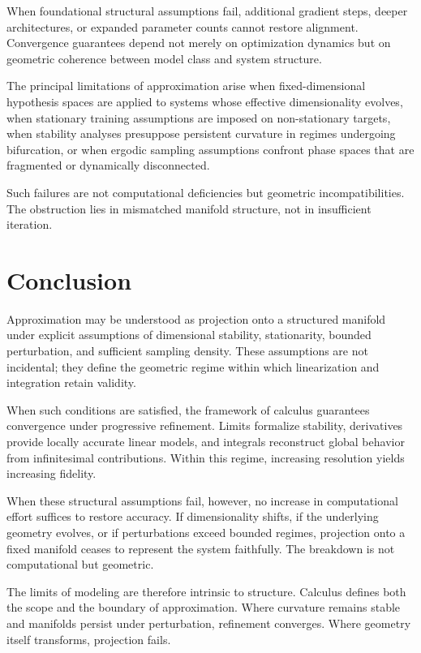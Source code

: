 \documentclass[12pt]{book}
\begin{document}
When foundational structural assumptions fail, additional gradient steps, deeper architectures, or expanded parameter counts cannot restore alignment. Convergence guarantees depend not merely on optimization dynamics but on geometric coherence between model class and system structure.

The principal limitations of approximation arise when fixed-dimensional hypothesis spaces are applied to systems whose effective dimensionality evolves, when stationary training assumptions are imposed on non-stationary targets, when stability analyses presuppose persistent curvature in regimes undergoing bifurcation, or when ergodic sampling assumptions confront phase spaces that are fragmented or dynamically disconnected.

Such failures are not computational deficiencies but geometric incompatibilities. The obstruction lies in mismatched manifold structure, not in insufficient iteration.

\section{Conclusion}

Approximation may be understood as projection onto a structured manifold under explicit assumptions of dimensional stability, stationarity, bounded perturbation, and sufficient sampling density. These assumptions are not incidental; they define the geometric regime within which linearization and integration retain validity.

When such conditions are satisfied, the framework of calculus guarantees convergence under progressive refinement. Limits formalize stability, derivatives provide locally accurate linear models, and integrals reconstruct global behavior from infinitesimal contributions. Within this regime, increasing resolution yields increasing fidelity.

When these structural assumptions fail, however, no increase in computational effort suffices to restore accuracy. If dimensionality shifts, if the underlying geometry evolves, or if perturbations exceed bounded regimes, projection onto a fixed manifold ceases to represent the system faithfully. The breakdown is not computational but geometric.

The limits of modeling are therefore intrinsic to structure. Calculus defines both the scope and the boundary of approximation. Where curvature remains stable and manifolds persist under perturbation, refinement converges. Where geometry itself transforms, projection fails.
\end{document}
